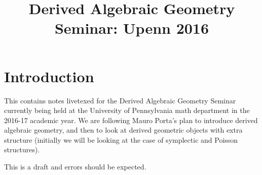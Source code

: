 \documentclass[10pt,a4paper,reqno,oneside]{book} %
\title{Derived Algebraic Geometry Seminar: Upenn 2016}
\theoremstyle{plain}
\theoremstyle{definition}
\theoremstyle{remark}
\numberwithin{equation}{section}
\begin{document}
\maketitle
\tableofcontents

\chapter*{Introduction}
 

This contains notes livetexed for the Derived Algebraic Geometry Seminar currently being held at the University of Pennsylvania 
math department in the 2016-17 academic year.  We are following Mauro Porta's plan to introduce derived algebraic geometry, 
and then to look at derived geometric objects with extra structure (initially we will be looking at the case of symplectic 
and Poisson structures).

This is a draft and errors should be expected.



















\end{document}
